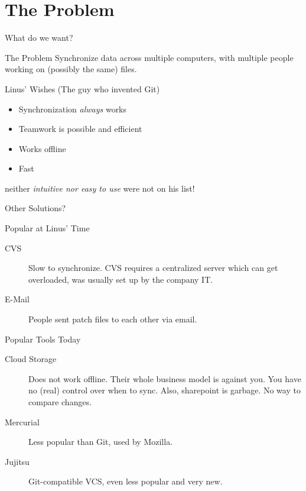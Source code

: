 \documentclass[xetex, handout]{beamer}
\begin{document}

\section{The Problem}

\begin{frame}{What do we want?}
  \begin{alertblock}{The Problem}
    Synchronize data across multiple computers, with multiple people working on
    (possibly the same) files.
  \end{alertblock}
  \pause

  \begin{block}{Linus' Wishes (The guy who invented Git)}
    \begin{itemize}
      \item Synchronization \emph{always} works
      \item Teamwork is possible and efficient
      \item Works offline
      \item Fast
    \end{itemize}
    neither \emph{intuitive nor easy to use} were not on his list!
  \end{block}
\end{frame}

\begin{frame}{Other Solutions?}
  \begin{block}{Popular at Linus' Time}
    \begin{description}
      \item[CVS] Slow to synchronize. CVS requires a centralized server which
        can get overloaded, was usually set up by the company IT.
      \item[E-Mail] People sent patch files to each other via email.
    \end{description}
  \end{block}
  \begin{block}{Popular Tools Today}
    \begin{description}
      \item[Cloud Storage] Does not work offline. Their whole business model is
        against you. You have no (real) control over when to sync. Also,
        sharepoint is garbage. No way to compare changes.

      \item[Mercurial] Less popular than Git, used by Mozilla.

      \item[Jujitsu] Git-compatible VCS, even less popular and very new.
    \end{description}
  \end{block}
\end{frame}
\end{document}
